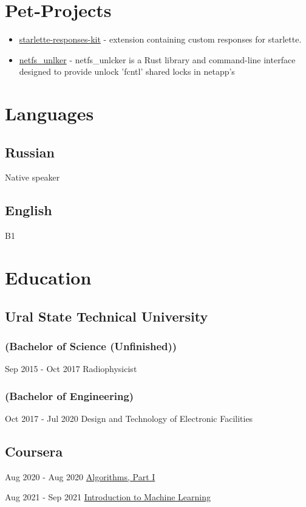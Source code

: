 \documentclass{article}
\begin{document}
\section*{Pet-Projects}
\begin{itemize}
    \item \href{https://github.com/WindowGenerator/starlette-responses-kit}{starlette-responses-kit} - extension containing custom responses for starlette.
    \item \href{https://github.com/WindowGenerator/netfs_unlker}{netfs\_unlker} - netfs\_unlcker is a Rust library and command-line interface designed to provide unlock 'fcntl' shared locks in netapp's
\end{itemize}

\section*{Languages}
\subsection*{Russian}
Native speaker 
\subsection*{English}
B1 

\section*{Education}
\subsection*{Ural State Technical University}
\subsubsection*{(Bachelor of Science (Unfinished))}
Sep 2015 - Oct 2017
Radiophysicist

\subsubsection*{(Bachelor of Engineering)}
Oct 2017 - Jul 2020
Design and Technology of Electronic Facilities

\subsection*{Coursera}
Aug 2020 - Aug 2020
\href{https://www.coursera.org/learn/algorithms-part1}{Algorithms, Part I}

Aug 2021 - Sep 2021
\href{https://www.coursera.org/learn/vvedenie-mashinnoe-obuchenie}{Introduction to Machine Learning}
\end{document}
